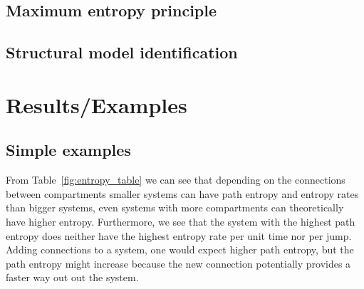 \documentclass[smallextended]{svjour3}
\makeatletter
\renewcommand*{\eqref}[1]{%
  \hyperref[{#1}]{\textup{\tagform@{\ref*{#1}}}}%
}
\newcommand{\R}{\mathbb{R}}
\newcommand{\E}{\mathbb{E}}
\renewcommand{\H}{\mathbb{H}}
\newcommand{\suml}{\sum\limits}
\makeatother
\begin{document}
% 
% 
% 	

\subsection{Maximum entropy principle}

\subsection{Structural model identification}


\section{Results/Examples}

\subsection{Simple examples}
From Table~\ref{fig:entropy_table} we can see that depending on the connections between compartments smaller systems can have path entropy and entropy rates than bigger systems, even systems with more compartments can theoretically have higher entropy.
Furthermore, we see that the system with the highest path entropy does neither have the highest entropy rate per unit time nor per jump.
Adding connections to a system, one would expect higher path entropy, but the path entropy might increase because the new connection potentially provides a faster way out out the system.
\end{document}
